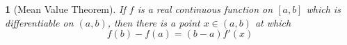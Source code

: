 \documentclass[12pt]{article}
\numberwithin{equation}{section}
\newcommand{\navy}[1]{\textcolor{MidnightBlue}{\bf #1}}
\theoremstyle{plain}
\newtheorem{theorem}{\color{ForestGreen}{\textbf{Theorem}}}[section]
\theoremstyle{definition}
\newtheorem{definition}{\color{MidnightBlue}{\textbf{Definition}}}[section]
\newcommand\norm[1]{\lVert#1\rVert}
\newcommand{\1}{\mathbbm 1}
\def\d{\delta}
\newcommand{\p}{\varphi}
\newcommand{\e}{\varepsilon}
\begin{document}
\begin{theorem}[Mean Value Theorem]
	If $f$ is a real continuous function on $[a,b]$ which is differentiable on $(a,b)$, then there is a point $x \in (a,b)$ at which 
	\begin{equation}
		f(b) - f(a) = (b - a) f'(x)
	\end{equation}
\end{theorem}







\end{document}
